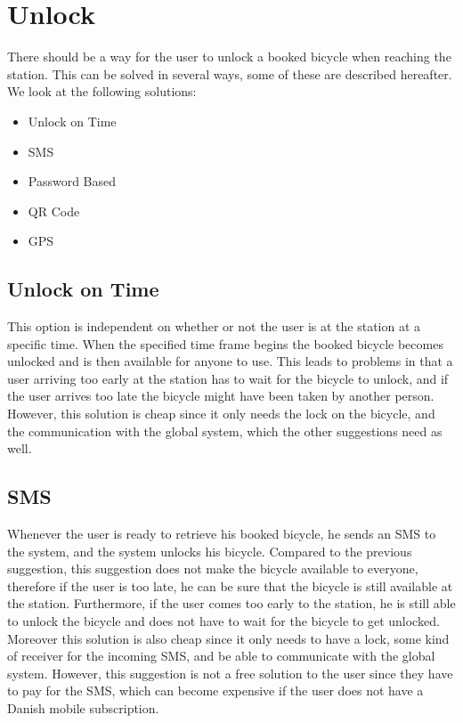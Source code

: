 \section{Unlock}\label{sec:Lock}
There should be a way for the user to unlock a booked bicycle when reaching the station.
This can be solved in several ways, some of these are described hereafter.
We look at the following solutions:

\begin{itemize}
	\item Unlock on Time
	\item SMS
	\item Password Based
	\item QR Code
	\item GPS
\end{itemize}

\subsection{Unlock on Time}
This option is independent on whether or not the user is at the station at a specific time.
When the specified time frame begins the booked bicycle becomes unlocked and is then available for anyone to use.
This leads to problems in that a user arriving too early at the station has to wait for the bicycle to unlock, and if the user arrives too late the bicycle might have been taken by another person.
However, this solution is cheap since it only needs the lock on the bicycle, and the communication with the global system, which the other suggestions need as well.

\subsection{SMS}
Whenever the user is ready to retrieve his booked bicycle, he sends an SMS to the system, and the system unlocks his bicycle.
Compared to the previous suggestion, this suggestion does not make the bicycle available to everyone, therefore if the user is too late, he can be sure that the bicycle is still available at the station.
Furthermore, if the user comes too early to the station, he is still able to unlock the bicycle and does not have to wait for the bicycle to get unlocked.
Moreover this solution is also cheap since it only needs to have a lock, some kind of receiver for the incoming SMS, and be able to communicate with the global system.
However, this suggestion is not a free solution to the user since they have to pay for the SMS, which can become expensive if the user does not have a Danish mobile subscription.

